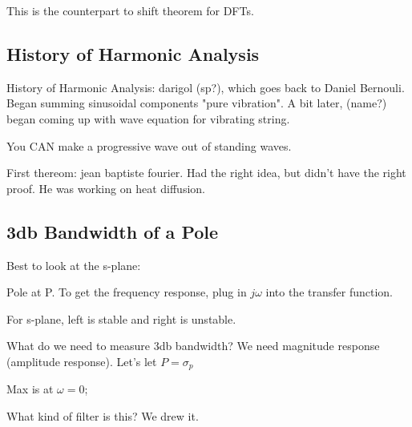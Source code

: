 This is the counterpart to shift theorem for DFTs. 



\subsection*{History of Harmonic Analysis}
History of Harmonic Analysis: darigol (sp?), which goes back to 
Daniel Bernouli. Began summing sinusoidal components "pure vibration". 
A bit later, (name?) began coming up with wave equation for vibrating string. 

You CAN make a progressive wave out of standing waves. 

First thereom: jean baptiste fourier. Had the right idea, but 
didn't have the right proof. He was working on heat diffusion. 

\subsection*{3db Bandwidth of a Pole}
Best to look at the s-plane:

Pole at P. To get the frequency response, plug in $j\omega$ into the transfer
function. 

For s-plane, left is stable and right is unstable. 


What do we need to measure 3db bandwidth? We need magnitude response 
(amplitude response). 
Let's let $P = \sigma_p$

Max is at $\omega = 0$;


What kind of filter is this? We drew it. 


